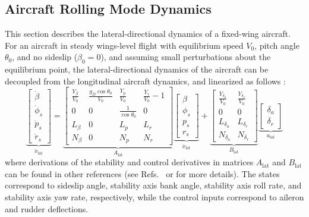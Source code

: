 \subsection{Aircraft Rolling Mode Dynamics} \label{subsec:latdir_model}
This section describes the lateral-directional dynamics of a fixed-wing aircraft. For an aircraft in steady wings-level flight with equilibrium speed $V_0$, pitch angle $\theta_0$, and no sideslip ($\beta_0 = 0$), and assuming small perturbations about the equilibrium point, the lateral-directional dynamics of the aircraft can be decoupled from the longitudinal aircraft dynamics, and linearized as follows \cite{stevens2015aircraft}:
\begin{equation}
	\underbrace{\begin{bmatrix}\dot \beta \\ \dot \phi_s \\ \dot p_s \\ \dot r_s \end{bmatrix}}_{\dot{x}_{\mathrm{lat}}} = \underbrace{\begin{bmatrix}
			\frac{Y_\beta}{V_0} & \frac{g_D\cos{\theta_0}}{V_0} & \frac{Y_p}{V_0} & \frac{Y_r}{V_0} - 1 \\
			0 & 0 & \frac{1}{\cos{\theta_0}} & 0 \\
			L_\beta & 0 & L_p & L_r \\
			N_\beta & 0 & N_p & N_r
		\end{bmatrix}}_{A_{\mathrm{lat}}}
		\underbrace{\begin{bmatrix} \beta \\ \phi_s \\ p_s \\ r_s \end{bmatrix}}_{\dot{x}_{\mathrm{lat}}} + 
		\underbrace{\begin{bmatrix}
			\frac{Y_{\delta_a}}{V_0} & \frac{Y_{\delta_r}}{V_0} \\
			0 & 0 \\
			L_{\delta_a} & L_{\delta_r} \\
			N_{\delta_a} & N_{\delta_r} 
		\end{bmatrix}}_{B_{\mathrm{lat}}} 
		\underbrace{\begin{bmatrix}\delta_a \\ \delta_r \end{bmatrix}}_{u_{\mathrm{lat}}}
\end{equation}
\noindent where derivations of the stability and control derivatives in matrices $A_{\mathrm{lat}}$ and $B_{\mathrm{lat}}$ can be found in other references (see Refs.~\cite{stevens2015aircraft} or \cite{lavretsky2013robust} for more details). The states correspond to sideslip angle, stability axis bank angle, stability axis roll rate, and stability axis yaw rate, respectively, while the control inputs correspond to aileron and rudder deflections.

